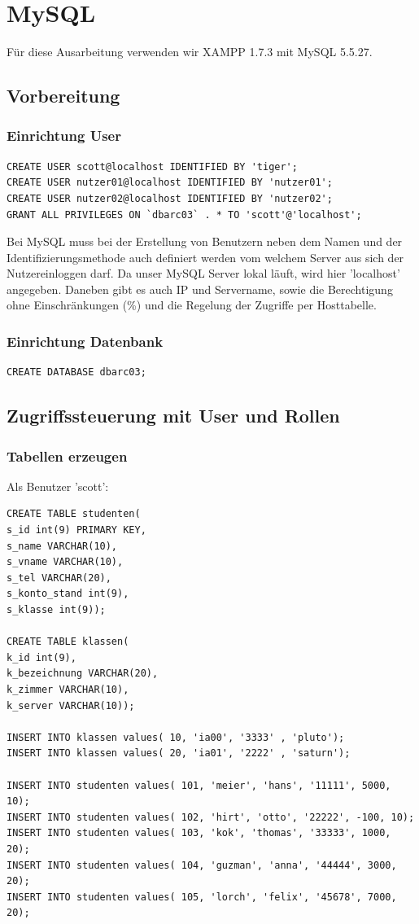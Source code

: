 \documentclass[10pt]{scrreprt}
\begin{document}
\chapter{MySQL}
Für diese Ausarbeitung verwenden wir XAMPP 1.7.3 mit MySQL 5.5.27.
\section{Vorbereitung}
\subsection{Einrichtung User}
\begin{lstlisting}[style=sql]
CREATE USER scott@localhost IDENTIFIED BY 'tiger';
CREATE USER nutzer01@localhost IDENTIFIED BY 'nutzer01';
CREATE USER nutzer02@localhost IDENTIFIED BY 'nutzer02';
GRANT ALL PRIVILEGES ON `dbarc03` . * TO 'scott'@'localhost';
\end{lstlisting}
Bei MySQL muss bei der Erstellung von Benutzern neben dem Namen und der Identifizierungsmethode auch definiert werden vom welchem Server aus sich der Nutzereinloggen darf. Da unser MySQL Server lokal läuft, wird hier 'localhost' angegeben. Daneben gibt es auch IP und Servername, sowie die Berechtigung ohne Einschränkungen (\%) und die Regelung der Zugriffe per Hosttabelle.
\subsection{Einrichtung Datenbank}
\begin{lstlisting}[style=sql]
CREATE DATABASE dbarc03;
\end{lstlisting}

\section{Zugriffssteuerung mit User und Rollen}
\subsection{Tabellen erzeugen}
Als Benutzer 'scott':
\begin{lstlisting}[style=sql]
CREATE TABLE studenten(
s_id int(9) PRIMARY KEY,
s_name VARCHAR(10),
s_vname VARCHAR(10),
s_tel VARCHAR(20),
s_konto_stand int(9),
s_klasse int(9));

CREATE TABLE klassen(
k_id int(9),
k_bezeichnung VARCHAR(20),
k_zimmer VARCHAR(10),
k_server VARCHAR(10));

INSERT INTO klassen values( 10, 'ia00', '3333' , 'pluto');
INSERT INTO klassen values( 20, 'ia01', '2222' , 'saturn');

INSERT INTO studenten values( 101, 'meier', 'hans', '11111', 5000, 10);
INSERT INTO studenten values( 102, 'hirt', 'otto', '22222', -100, 10);
INSERT INTO studenten values( 103, 'kok', 'thomas', '33333', 1000, 20);
INSERT INTO studenten values( 104, 'guzman', 'anna', '44444', 3000, 20);
INSERT INTO studenten values( 105, 'lorch', 'felix', '45678', 7000, 20);
\end{lstlisting}
\end{document}
